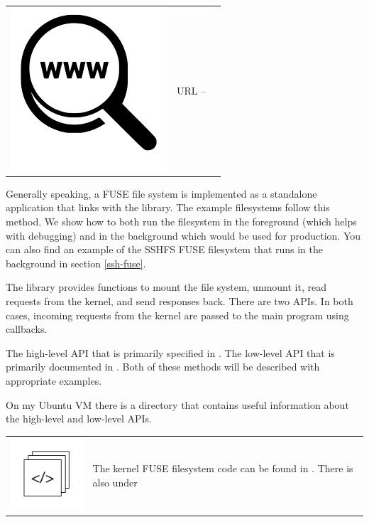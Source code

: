 \begin{table}[h]
\begin{tabular}{lcl}
\parbox[r]{0.5in}{\includegraphics[scale=0.15]{figures/url.png}} & \parbox[l]{0.55in}{URL  -- } & \parbox[l]{3in}{}
\end{tabular}
\end{table}

\noindent
Generally speaking, a FUSE file system is  implemented as a standalone application that links with the  library. The example filesystems follow this method. We show how to both run the filesystem in the foreground (which helps with debugging) and in the background which would be used for production. You can also find an example of the SSHFS FUSE filesystem that runs in the background in section \ref{ssh-fuse}.

The  library provides functions to mount the file system, unmount it, read requests from the kernel, and send responses back. There are two APIs. In both cases, incoming requests from the kernel are passed to the main program using callbacks. 

The high-level API that is primarily specified in . The low-level API that is primarily documented in . Both of these methods will be described with appropriate examples.

On my Ubuntu VM there is a directory  that contains useful information about the high-level and low-level APIs. 

\begin{table}[h]
\begin{tabular}{ll}
\parbox[l]{0.6in}{\includegraphics[scale=0.8]{figures/src-xref.pdf}} & \parbox[l]{3.8in}{\small{The kernel FUSE filesystem code can be found in . There is also  under }}
\end{tabular}
\end{table}

